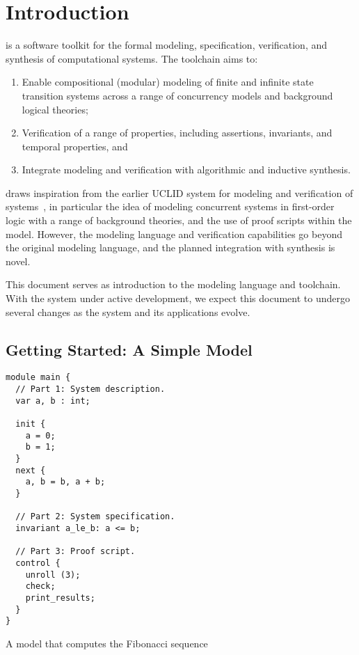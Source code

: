 \chapter{Introduction}

\uclid{} is a software toolkit for the formal modeling, specification,
verification, and synthesis of computational systems. 
The \uclid{} toolchain aims to:
\begin{enumerate}
	\item Enable compositional (modular) modeling of finite and infinite state transition systems across a range of concurrency models and background logical theories;
\item Verification of a range of properties, including assertions, invariants, and temporal properties, and %
\item Integrate modeling and verification with algorithmic and inductive synthesis.
\end{enumerate}

\uclid draws inspiration from the earlier {UCLID} system for modeling
and verification of systems~\cite{bryant-cav02,uclid-www}, in particular
the idea of modeling concurrent systems in first-order logic 
with a range of background theories, and the use of proof scripts
within the model. However, the \uclid modeling
language and verification capabilities go beyond the original modeling 
language, and the planned integration with synthesis is novel.

This document serves as introduction to the \uclid{} modeling 
language and toolchain. With the \uclid system under active
development, we expect this document to undergo several changes
as the system and its applications evolve.

\section{Getting Started: A Simple \uclid{} Model}

\begin{uclidlisting}[htbp]
\begin{lstlisting}[language=uclid,style=uclidstyle]
module main {
  // Part 1: System description.
  var a, b : int;

  init {
    a = 0;
    b = 1;
  }
  next {
    a, b = b, a + b;
  }

  // Part 2: System specification.
  invariant a_le_b: a <= b;

  // Part 3: Proof script.
  control {
    unroll (3);
    check;
    print_results;
  }
}
\end{lstlisting}
\label{ex:fib-model}
\caption{A \uclid{} model that computes the Fibonacci sequence}
\end{uclidlisting}

